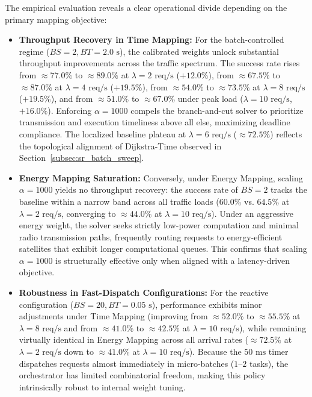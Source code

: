 The empirical evaluation reveals a clear operational divide depending on the primary mapping objective:
\begin{itemize}
    \item \textbf{Throughput Recovery in Time Mapping:} For the batch-controlled regime ($BS=2, BT=2.0\text{ s}$), the calibrated weights unlock substantial throughput improvements across the traffic spectrum. The success rate rises from $\approx 77.0\%$ to $\approx 89.0\%$ at $\lambda=2\text{ req/s}$ ($+12.0\%$), from $\approx 67.5\%$ to $\approx 87.0\%$ at $\lambda=4\text{ req/s}$ ($+19.5\%$), from $\approx 54.0\%$ to $\approx 73.5\%$ at $\lambda=8\text{ req/s}$ ($+19.5\%$), and from $\approx 51.0\%$ to $\approx 67.0\%$ under peak load ($\lambda=10\text{ req/s}$, $+16.0\%$). Enforcing $\alpha=1000$ compels the branch-and-cut solver to prioritize transmission and execution timeliness above all else, maximizing deadline compliance. The localized baseline plateau at $\lambda=6\text{ req/s}$ ($\approx 72.5\%$) reflects the topological alignment of Dijkstra-Time observed in Section~\ref{subsec:sr_batch_sweep}.
    \item \textbf{Energy Mapping Saturation:} Conversely, under Energy Mapping, scaling $\alpha=1000$ yields no throughput recovery: the success rate of $BS=2$ tracks the baseline within a narrow band across all traffic loads ($60.0\%$ vs. $64.5\%$ at $\lambda=2\text{ req/s}$, converging to $\approx 44.0\%$ at $\lambda=10\text{ req/s}$). Under an aggressive energy weight, the solver seeks strictly low-power computation and minimal radio transmission paths, frequently routing requests to energy-efficient satellites that exhibit longer computational queues. This confirms that scaling $\alpha=1000$ is structurally effective only when aligned with a latency-driven objective.
    \item \textbf{Robustness in Fast-Dispatch Configurations:} For the reactive configuration ($BS=20, BT=0.05\text{ s}$), performance exhibits minor adjustments under Time Mapping (improving from $\approx 52.0\%$ to $\approx 55.5\%$ at $\lambda=8\text{ req/s}$ and from $\approx 41.0\%$ to $\approx 42.5\%$ at $\lambda=10\text{ req/s}$), while remaining virtually identical in Energy Mapping across all arrival rates ($\approx 72.5\%$ at $\lambda=2\text{ req/s}$ down to $\approx 41.0\%$ at $\lambda=10\text{ req/s}$). Because the $50\text{ ms}$ timer dispatches requests almost immediately in micro-batches ($1\text{--}2$ tasks), the orchestrator has limited combinatorial freedom, making this policy intrinsically robust to internal weight tuning.
\end{itemize}
\FloatBarrier
